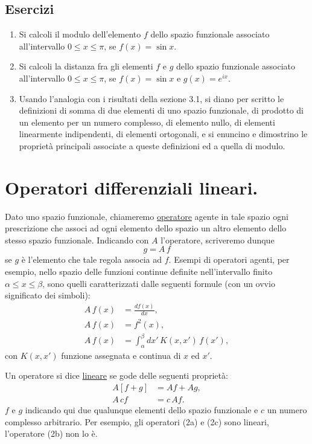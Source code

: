 \documentclass[11pt, a4paper]{book}
\numberwithin{equation}{section}
\newenvironment{esercizi}{\subsection*{Esercizi}\begin{enumerate}}{\end{enumerate}}
\begin{document}
\begin{esercizi}
\item Si calcoli il modulo dell'elemento $f$ dello spazio funzionale
associato all'intervallo $0 \leq x \leq \pi$, se $f(x) = \sin x$.

\item Si calcoli la distanza fra gli elementi $f$ e $g$ dello spazio
funzionale associato all'intervallo $0 \leq x \leq \pi$, se $f(x) =
\sin x$ e $g(x) = e^{ix}$.

\item Usando l'analogia con i risultati della sezione 3.1, si diano per
scritto le definizioni di somma di due elementi di uno spazio
funzionale, di prodotto di un elemento per un numero complesso, di
elemento nullo, di elementi linearmente indipendenti, di elementi
ortogonali, e si enuncino e dimostrino le proprietà principali associate
a queste definizioni ed a quella di modulo.

\end{esercizi}

\section{Operatori differenziali lineari.}

Dato uno spazio funzionale, chiameremo \underline{operatore} agente in
tale spazio ogni prescrizione che associ ad ogni elemento dello spazio
un altro elemento dello stesso spazio funzionale. Indicando con $A$
l'operatore, scriveremo dunque
\begin{equation}
g = A\,f
\end{equation}
se $g$ è l'elemento che tale regola associa ad $f$. Esempi di operatori
agenti, per esempio, nello spazio delle funzioni continue definite
nell'intervallo finito $\alpha \leq x \leq \beta$, sono quelli
caratterizzati dalle seguenti formule (con un ovvio significato dei
simboli):
\begin{align}
A\,f(x) &= \frac{df(x)}{dx}, \tag{2a} \\
A\,f(x) &= f^2(x), \tag{2b} \\
A\,f(x) &= \int_\alpha^\beta dx'\,K(x,x')\,f(x'), \tag{2c}
\end{align}
con $K(x,x')$ funzione assegnata e continua di $x$ ed $x'$.

Un operatore si dice \underline{lineare} se gode delle seguenti
proprietà:
\begin{align}
A[f+g] &= Af + Ag, \tag{3a} \\
A\,cf  &= c\,Af.   \tag{3b}
\end{align}
$f$ e $g$ indicando qui due qualunque elementi dello spazio funzionale
e $c$ un numero complesso arbitrario. Per esempio, gli operatori (2a) e
(2c) sono lineari, l'operatore (2b) non lo è.
\end{document}
